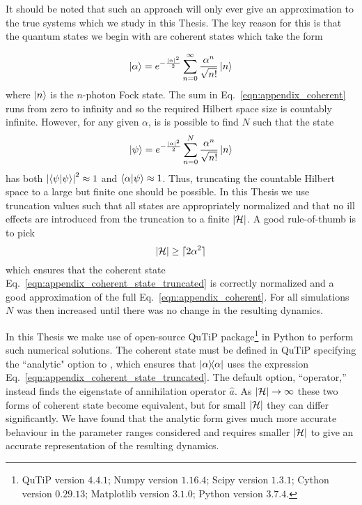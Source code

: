 It should be noted that such an approach will only ever give an approximation to the true systems which we study in this Thesis. The key reason for this is that the quantum states we begin with are coherent states which take the form

\begin{equation}\label{eqn:appendix_coherent}
\ket{\alpha} = e^{-\frac{\left|\alpha\right|^2}{2}}\sum_{n=0}^\infty \frac{\alpha^n}{\sqrt{n!}}\ket{n}
\end{equation}
where $\ket{n}$ is the $n$-photon Fock state. %
The sum in Eq.~\ref{eqn:appendix_coherent} runs from zero to infinity and so the required Hilbert space size is countably infinite. However, for any given $\alpha$, is is possible to find $N$ such that the state
\begin{equation}\label{eqn:appendix_coherent_state_truncated}
\ket{\psi} = e^{-\frac{\left|\alpha\right|^2}{2}}\sum_{n=0}^N \frac{\alpha^n}{\sqrt{n!}}\ket{n}
\end{equation} 
has both $\left| \ip{\psi} \right|^2 \approx 1$ and $\ip{\alpha}{\psi} \approx 1$. Thus, truncating the countable Hilbert space to a large but finite one should be possible. In this Thesis we use truncation values such that all states are appropriately normalized and that no ill effects are introduced from the truncation to a finite $\left|\mathcal{H}\right|$. A good rule-of-thumb is to pick
\begin{equation}\label{eqn:rule_of_thumb}
\left|\mathcal{H}\right| \ge \lceil 2 \alpha^2 \rceil
\end{equation}
which ensures that the coherent state Eq.~\ref{eqn:appendix_coherent_state_truncated} is correctly normalized and a good approximation of the full Eq.~\ref{eqn:appendix_coherent}. For all simulations $N$ was then increased until there was no change in the resulting dynamics.

In this Thesis we make use of open-source QuTiP package\footnote{QuTiP version $4.4.1$; Numpy version $1.16.4$; Scipy version $1.3.1$; Cython version $0.29.13$; Matplotlib version $3.1.0$; Python version $3.7.4$.} \cite{qutip2} in Python to perform such numerical solutions. The coherent state must be defined in QuTiP specifying the ``analytic" option to , which ensures that $\dyad{\alpha}$ uses the expression Eq.~\ref{eqn:appendix_coherent_state_truncated}. The default option, ``operator,'' instead finds the eigenstate of annihilation operator $\hat{a}$. As $\left|\mathcal{H}\right| \rightarrow \infty$ these two forms of coherent state become equivalent, but for small $\left|\mathcal{H}\right|$ they can differ significantly. We have found that the analytic form gives much more accurate behaviour in the parameter ranges considered and requires smaller $\left|\mathcal{H}\right|$ to give an accurate representation of the resulting dynamics.

